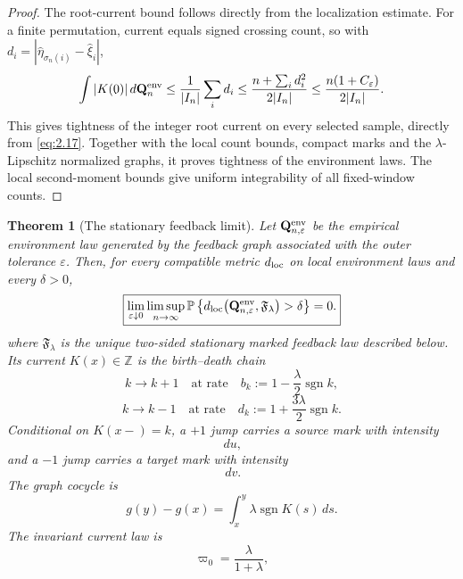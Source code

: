 \documentclass[11pt,reqno]{amsart}
\newtheorem{theorem}{Theorem}[section]
\theoremstyle{definition}
\theoremstyle{remark}
\numberwithin{equation}{section}
\newcommand{\Pp}{\mathbb P}
\newcommand{\cF}{\mathfrak F}
\newcommand{\sgn}{\operatorname{sgn}}
\begin{document}
\begin{proof}
The root-current bound follows directly from the localization estimate.
For a finite permutation, current equals signed crossing count, so with
\(d_i=|\widehat\eta_{\sigma_n(i)}-\widehat\xi_i|\),
\[
\int |K(0)|\,d\mathbf Q_n^{\rm env}
 \le \frac1{|I_n|}\sum_i d_i
 \le \frac{n+\sum_i d_i^2}{2|I_n|}
 \le \frac{n(1+C_\varepsilon)}{2|I_n|}.
\]
This gives tightness of the integer root current on every selected
sample, directly from \eqref{eq:2.17}.  Together with the local count bounds,
compact marks and the \(\lambda\)-Lipschitz normalized graphs, it
proves tightness of the environment laws.  The local second-moment
bounds give uniform integrability of all fixed-window counts.
\end{proof}

\begin{theorem}[The stationary feedback limit]
\label{thm:env}
Let \(\mathbf Q_{n,\varepsilon}^{\rm env}\) be the empirical environment
law generated by the feedback graph associated with the outer tolerance
\(\varepsilon\).  Then, for every compatible metric \(d_{\rm loc}\) on
local environment laws and every \(\delta>0\),
\begin{equation}
\boxed{
\lim_{\varepsilon\downarrow0}
\limsup_{n\to\infty}
\Pp\left\{
d_{\rm loc}\bigl(
\mathbf Q_{n,\varepsilon}^{\rm env},\cF_\lambda
\bigr)>\delta
\right\}=0.
}
\label{eq:3.0e}
\end{equation}
where \(\cF_\lambda\) is the unique two-sided stationary marked feedback
law described below.  Its current
\(K(x)\in\mathbb Z\) is the birth--death chain
\[
k\to k+1
\quad\text{at rate}\quad
b_k:=1-\frac{\lambda}{2}\sgn k,
\]
\begin{equation}
k\to k-1
\quad\text{at rate}\quad
d_k:=1+\frac{3\lambda}{2}\sgn k.
\label{eq:3.1}
\end{equation}
Conditional on \(K(x-)=k\), a \(+1\) jump carries a source mark with
intensity
\begin{equation}
[1-\lambda\sgn(k)(1-u)]\,du,
\label{eq:3.2}
\end{equation}
and a \(-1\) jump carries a target mark with intensity
\begin{equation}
[1+\lambda\sgn(k)(1+v)]\,dv.
\label{eq:3.3}
\end{equation}
The graph cocycle is
\begin{equation}
g(y)-g(x)=\int_x^y\lambda\sgn K(s)\,ds.
\label{eq:3.4}
\end{equation}
The invariant current law is
\begin{equation}
\varpi_0=\frac{\lambda}{1+\lambda},

\end{equation}
\end{theorem}
\end{document}
